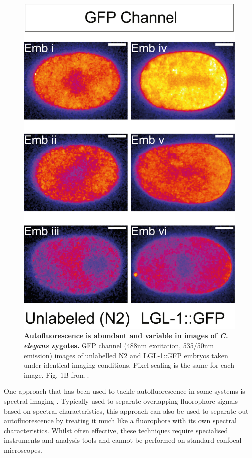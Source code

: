 \documentclass[12pt]{"report"}
\newcommand{\mycaption}[2]{\caption[#1]{\textbf{#1.} #2}}
\begin{document}
\begin{figure}
\includegraphics[scale=0.9]{saibr_n2_vs_lgl}
\mycaption{Autofluorescence is abundant and variable in images of \textit{C. elegans} zygotes}{GFP channel (488nm excitation, 535/50nm emission) images of unlabelled N2 and LGL-1::GFP embryos taken under identical imaging conditions. Pixel scaling is the same for each image. Fig. 1B from \textcite{Rodrigues2022}.}
\label{fig:saibr_n2_vs_lgl}
\end{figure}

One approach that has been used to tackle autofluorescence in some systems is spectral imaging \citep{Billinton2001}. Typically used to separate overlapping fluorophore signals based on spectral characteristics, this approach can also be used to separate out autofluorescence by treating it much like a fluorophore with its own spectral characteristics. Whilst often effective, these techniques require specialised instruments and analysis tools and cannot be performed on standard confocal microscopes.\\
\end{document}
